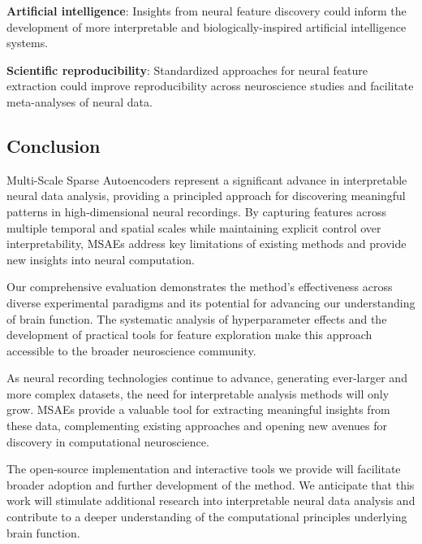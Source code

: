 \textbf{Artificial intelligence}: Insights from neural feature discovery could inform the development of more interpretable and biologically-inspired artificial intelligence systems.

\textbf{Scientific reproducibility}: Standardized approaches for neural feature extraction could improve reproducibility across neuroscience studies and facilitate meta-analyses of neural data.

\subsection{Conclusion}

Multi-Scale Sparse Autoencoders represent a significant advance in interpretable neural data analysis, providing a principled approach for discovering meaningful patterns in high-dimensional neural recordings. By capturing features across multiple temporal and spatial scales while maintaining explicit control over interpretability, MSAEs address key limitations of existing methods and provide new insights into neural computation.

Our comprehensive evaluation demonstrates the method's effectiveness across diverse experimental paradigms and its potential for advancing our understanding of brain function. The systematic analysis of hyperparameter effects and the development of practical tools for feature exploration make this approach accessible to the broader neuroscience community.

As neural recording technologies continue to advance, generating ever-larger and more complex datasets, the need for interpretable analysis methods will only grow. MSAEs provide a valuable tool for extracting meaningful insights from these data, complementing existing approaches and opening new avenues for discovery in computational neuroscience.

The open-source implementation and interactive tools we provide will facilitate broader adoption and further development of the method. We anticipate that this work will stimulate additional research into interpretable neural data analysis and contribute to a deeper understanding of the computational principles underlying brain function.
